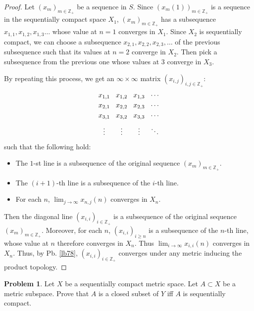 \documentclass[12pt,b5paper,notitlepage]{article}
\theoremstyle{definition}
\newtheorem{prob}{Problem}[section]
\theoremstyle{plain}
\newcommand{\Zbb}{\mathbb Z}
\numberwithin{equation}{section}
\begin{document}
\begin{proof}
Let $(x_m)_{m\in\Zbb_+}$ be a sequence in $S$. Since $(x_m(1))_{m\in\Zbb_+}$ is a sequence in the sequentially compact space $X_1$, $(x_m)_{m\in\Zbb_+}$ has a subsequence $x_{1,1},x_{1,2},x_{1,3}\dots$ whose value at $n=1$ converges in $X_1$. Since $X_2$ is sequentially compact, we can choose a subsequence $x_{2,1},x_{2,2},x_{2,3},\dots$ of the previous subsequence such that its values at $n=2$ converge in $X_2$. Then pick a subsequence from the previous one whose values at $3$ converge in $X_3$. 

By repeating this process, we get an $\infty\times\infty$ matrix $(x_{i,j})_{i,j\in\Zbb_+}$:
\begin{equation}
\begin{tikzcd}[sep=0cm]
{x_{1,1}} & {x_{1,2}} & {x_{1,3}} & \cdots \\
{x_{2,1}} & {x_{2,2}} & {x_{2,3}} & \cdots \\
{x_{3,1}} & {x_{3,2}} & {x_{3,3}} & \cdots \\
\vdots    & \vdots    & \vdots    & \ddots
\end{tikzcd}
\end{equation}
such that the following hold:
\begin{itemize}
\item The $1$-st line is a subsequence of the original sequence $(x_m)_{m\in\Zbb_+}$.
\item The $(i+1)$-th line is a subsequence of the $i$-th line.
\item For each $n$, $\lim_{j\rightarrow\infty} x_{n,j}(n)$ converges in $X_n$.
\end{itemize}
Then the diagonal line $(x_{i,i})_{i\in\Zbb_+}$ is a subsequence of the original sequence $(x_m)_{m\in\Zbb_+}$. Moreover, for each $n$, $(x_{i,i})_{i\geq n}$ is a subsequence of the $n$-th line, whose value at $n$ therefore converges in $X_n$. Thus $\lim_{i\rightarrow\infty} x_{i,i}(n)$ converges in $X_n$. Thus, by Pb. \ref{lb78}, $(x_{i,i})_{i\in\Zbb_+}$ converges under any metric inducing the product topology.
\end{proof}



\begin{prob}\label{lb90}
Let $X$ be a sequentially compact metric space. Let $A\subset X$ be a metric subspace. Prove that $A$ is a closed subset of $Y$ iff $A$ is sequentially compact. 
\end{prob}
\end{document}
